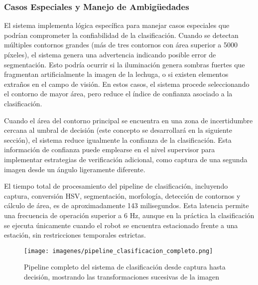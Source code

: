 \subsubsection{Casos Especiales y Manejo de Ambigüedades}

El sistema implementa lógica específica para manejar casos especiales que podrían comprometer la confiabilidad de la clasificación. Cuando se detectan múltiples contornos grandes (más de tres contornos con área superior a 5000 píxeles), el sistema genera una advertencia indicando posible error de segmentación. Esto podría ocurrir si la iluminación genera sombras fuertes que fragmentan artificialmente la imagen de la lechuga, o si existen elementos extraños en el campo de visión. En estos casos, el sistema procede seleccionando el contorno de mayor área, pero reduce el índice de confianza asociado a la clasificación.

Cuando el área del contorno principal se encuentra en una zona de incertidumbre cercana al umbral de decisión (este concepto se desarrollará en la siguiente sección), el sistema reduce igualmente la confianza de la clasificación. Esta información de confianza puede emplearse en el nivel supervisor para implementar estrategias de verificación adicional, como captura de una segunda imagen desde un ángulo ligeramente diferente.

El tiempo total de procesamiento del pipeline de clasificación, incluyendo captura, conversión HSV, segmentación, morfología, detección de contornos y cálculo de área, es de aproximadamente 143 milisegundos. Esta latencia permite una frecuencia de operación superior a 6 Hz, aunque en la práctica la clasificación se ejecuta únicamente cuando el robot se encuentra estacionado frente a una estación, sin restricciones temporales estrictas.

\begin{figure}[h]
\centering
\texttt{[image: imagenes/pipeline\_clasificacion\_completo.png]}
\caption{Pipeline completo del sistema de clasificación desde captura hasta decisión, mostrando las transformaciones sucesivas de la imagen}
\label{fig:pipeline_clasificacion}
\end{figure}